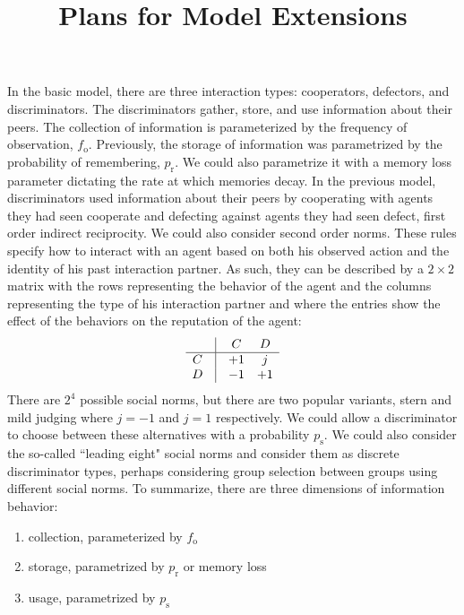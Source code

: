\documentclass{article}
\begin{document}
\title{Plans for Model Extensions}
\maketitle

In the basic model, there are three interaction types: cooperators, defectors, and discriminators.  The discriminators gather, store, and use information about their peers.  The collection of information is parameterized by the frequency of observation, $f_\text{o}$.  Previously, the storage of information was parametrized by the probability of remembering, $p_\text{r}$. We could also parametrize it with a memory loss parameter dictating the rate at which memories decay. In the previous model, discriminators used information about their peers by cooperating with agents they had seen cooperate and defecting against agents they had seen defect, first order indirect reciprocity.  We could also consider second order norms.  These rules specify how to interact with an agent based on both his observed action and the identity of his past interaction partner.  As such, they can be described by a $2\times 2$ matrix with the rows representing the behavior of the agent and the columns representing the type of his interaction partner and where the entries show the effect of the behaviors on the reputation of the agent:
$$
\begin{array}{ccccc}
 &\vline& C & D 
\\\hline C &\vline & +1 & j
\\ D & \vline & -1 & +1 
\end{array}
$$
There are $2^4$ possible social norms, but there are two popular variants, stern and mild judging where $j=-1$ and $j=1$ respectively.  We could allow a discriminator to choose between these alternatives with a probability $p_\text{s}$. We could also consider the so-called ``leading eight" social norms and consider them as discrete discriminator types, perhaps considering group selection between groups using different social norms.  To summarize, there are three dimensions of information behavior:
\begin{enumerate}
\item collection, parameterized by $f_\text{o}$ 
\item storage, parametrized by $p_\text{r}$ or memory loss
\item usage, parametrized by $p_\text{s}$
\end{enumerate}
\end{document}
